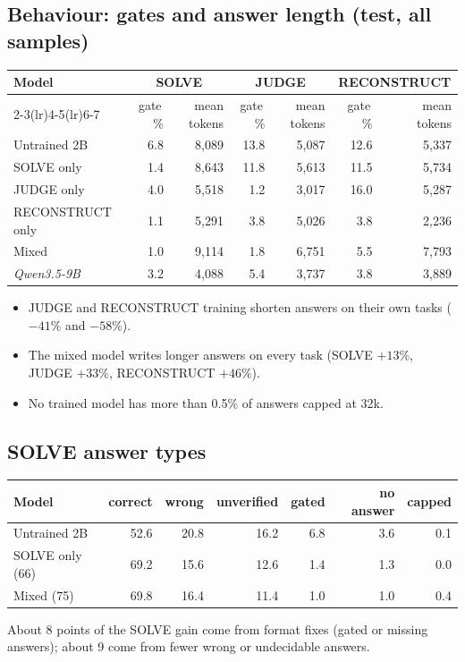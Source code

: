 \documentclass[10pt,a4paper]{article}
\begin{document}
\subsection{Behaviour: gates and answer length (test, all samples)}
\begin{table}[H]
\centering\small
\begin{tabular}{lrrrrrr}
\toprule
Model & \multicolumn{2}{c}{SOLVE} & \multicolumn{2}{c}{JUDGE} & \multicolumn{2}{c}{RECONSTRUCT}\\
\cmidrule(lr){2-3}\cmidrule(lr){4-5}\cmidrule(lr){6-7}
 & gate\,\% & mean tokens & gate\,\% & mean tokens & gate\,\% & mean tokens\\
\midrule
Untrained 2B & 6.8 & 8,089 & 13.8 & 5,087 & 12.6 & 5,337\\
SOLVE only & 1.4 & 8,643 & 11.8 & 5,613 & 11.5 & 5,734\\
JUDGE only & 4.0 & 5,518 & 1.2 & 3,017 & 16.0 & 5,287\\
RECONSTRUCT only & 1.1 & 5,291 & 3.8 & 5,026 & 3.8 & 2,236\\
Mixed & 1.0 & 9,114 & 1.8 & 6,751 & 5.5 & 7,793\\
\textit{Qwen3.5-9B} & 3.2 & 4,088 & 5.4 & 3,737 & 3.8 & 3,889\\
\bottomrule
\end{tabular}
\end{table}
\noindent
\begin{itemize}
\item JUDGE and RECONSTRUCT training shorten answers on their own tasks ($-41\%$ and $-58\%$).
\item The mixed model writes longer answers on every task (SOLVE $+13\%$, JUDGE $+33\%$, RECONSTRUCT $+46\%$).
\item No trained model has more than 0.5\% of answers capped at 32k.
\end{itemize}

\subsection{SOLVE answer types}
\begin{table}[H]
\centering\small
\begin{tabular}{lrrrrrr}
\toprule
Model & correct & wrong & unverified & gated & no answer & capped\\
\midrule
Untrained 2B & 52.6 & 20.8 & 16.2 & 6.8 & 3.6 & 0.1\\
SOLVE only (66) & 69.2 & 15.6 & 12.6 & 1.4 & 1.3 & 0.0\\
Mixed (75) & 69.8 & 16.4 & 11.4 & 1.0 & 1.0 & 0.4\\
\bottomrule
\end{tabular}
\end{table}
\noindent About 8 points of the SOLVE gain come from format fixes (gated or missing answers); about 9 come from
fewer wrong or undecidable answers.
\end{document}
